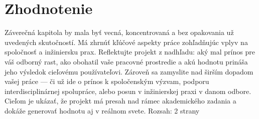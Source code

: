 \section{Zhodnotenie}
Záverečná kapitola by mala byť vecná, koncentrovaná a bez opakovania už uvedených skutočností. Má zhrnúť kľúčové aspekty práce zohľadňujúc vplyv na spoločnosť a inžiniersku prax.  Reflektujte projekt z nadhľadu: aký mal prínos pre váš odborný rast, ako obohatil vaše pracovné prostredie a akú hodnotu prináša jeho výsledok cieľovému používateľovi. Zároveň sa zamyslite nad širším dopadom vašej práce — či už ide o prínos k spoločenským výzvam, podporu interdisciplinárnej spolupráce, alebo posun v inžinierskej praxi v danom odbore. Cieľom je ukázať, že projekt má presah nad rámec akademického zadania a dokáže generovať hodnotu aj v reálnom svete. Rozsah: 2 strany